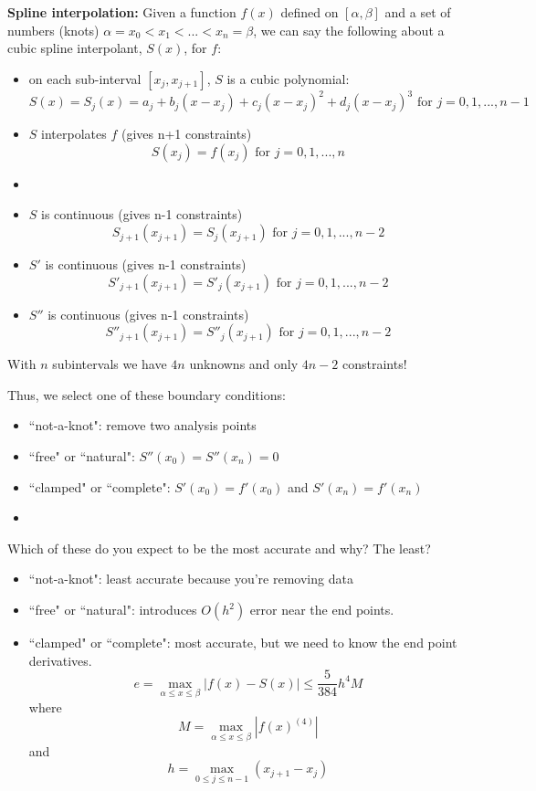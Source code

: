 \documentclass[12pt]{exam}
\begin{document}
\textbf{Spline interpolation:} Given a function $f(x)$ defined on $[\alpha, \beta]$ and a set of numbers (knots) $\alpha=x_0 < x_1 < ... < x_n = \beta$, we can say the following about a cubic spline interpolant, $S(x)$, for $f$:
%
\begin{itemize}
\item on each sub-interval $[x_j, x_{j+1}]$, $S$ is a cubic polynomial:
\[S(x) = S_j(x) = a_j + b_j(x-x_j) + c_j(x-x_j)^2 + d_j(x-x_j)^3 \text{ for } j = 0, 1, ..., n-1\]

\ifprintanswers
\item $S$ interpolates $f$ (gives n+1 constraints)
\[S(x_j) = f(x_j)\text{ for } j = 0, 1, ..., n\]
\else
\item
 \vspace*{3em}
\fi

\item $S$ is continuous (gives n-1 constraints)
\[S_{j+1}(x_{j+1}) = S_{j}(x_{j+1})\text{ for } j = 0, 1, ..., n-2\]

\item $S'$ is continuous (gives n-1 constraints)
\[S'_{j+1}(x_{j+1}) = S'_{j}(x_{j+1})\text{ for } j = 0, 1, ..., n-2\]

\item $S''$ is continuous (gives n-1 constraints)
\[S''_{j+1}(x_{j+1}) = S''_{j}(x_{j+1})\text{ for } j = 0, 1, ..., n-2\]
\end{itemize}
%
With $n$ subintervals we have $4n$ unknowns and only $4n-2$ constraints!

Thus, we select one of these boundary conditions:
\begin{itemize}
\item ``not-a-knot": remove two analysis points
\item ``free" or ``natural": $S''(x_0) = S''(x_n) = 0$ 
\ifprintanswers
\item ``clamped" or ``complete": $S'(x_0) = f'(x_0)$ and $S'(x_n) = f'(x_n)$ 
\else
\item
\fi
\end{itemize}

Which of these do you expect to be the most accurate and why? The least?
\begin{itemize}
\item ``not-a-knot": least accurate because you're removing data
\item ``free" or ``natural": introduces $O(h^2)$ error near the end points.
\item ``clamped" or ``complete": most accurate, but we need to know the end point derivatives.
\[e = \max_{\alpha \leq x \leq \beta} |f(x) - S(x)| \leq \frac{5}{384}h^4 M\]
where
\[M = \max_{\alpha \leq x \leq \beta} |f(x)^{(4)}|\]
and
\[h = \max_{0 \leq j \leq n-1} (x_{j+1} - x_{j})\]
\end{itemize}
\end{document}
